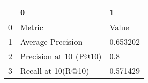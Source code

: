 \begin{tabular}{lll}
\toprule
{} &                       0 &         1 \\
\midrule
0 &                  Metric &     Value \\
1 &       Average Precision &  0.653202 \\
2 &  Precision at 10 (P@10) &       0.8 \\
3 &      Recall at 10(R@10) &  0.571429 \\
\bottomrule
\end{tabular}
